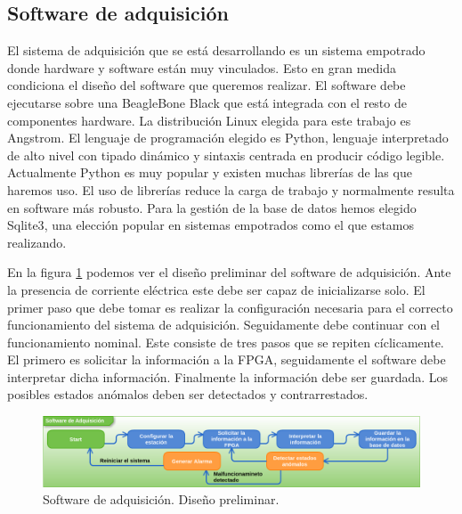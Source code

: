 	\subsection{Software de adquisición}
		El sistema de adquisición que se está desarrollando es un sistema empotrado donde hardware y software están muy vinculados. Esto en
		gran medida condiciona el diseño del software que queremos realizar. El software debe ejecutarse sobre una BeagleBone
		Black\cite{Beagle} que está integrada con el resto de componentes hardware. La distribución Linux elegida para este trabajo es
		Angstrom. El lenguaje de programación elegido es Python\cite{Python}, lenguaje interpretado de alto nivel con tipado dinámico y
		sintaxis centrada en producir código legible. Actualmente Python es muy popular y existen muchas librerías de las que haremos uso. El
		uso de librerías reduce la carga de trabajo y normalmente resulta en software más robusto. Para la gestión de la base de datos hemos
		elegido Sqlite3\cite{Sqlite}, una elección popular en sistemas empotrados como el que estamos realizando. 
		\par
		En la figura \ref{fig:soft_control_preliminar} podemos ver el diseño preliminar del software de adquisición. Ante la presencia de
		corriente eléctrica este debe ser capaz de inicializarse solo. El primer paso que debe tomar es realizar la configuración necesaria
		para el correcto funcionamiento del sistema de adquisición. Seguidamente debe continuar con el funcionamiento nominal. Este consiste
		de tres pasos que se repiten cíclicamente. El primero es solicitar la información a la FPGA, seguidamente el software debe interpretar
		dicha información. Finalmente la información debe ser guardada. Los posibles estados anómalos deben ser detectados y contrarrestados. 
		\begin{figure}[h]
			\centering
			\includegraphics[keepaspectratio, width=1\textwidth]{./img/soft_control_preliminar.png}
			\caption{Software de adquisición. Diseño preliminar.}
			\label{fig:soft_control_preliminar}
		\end{figure}
